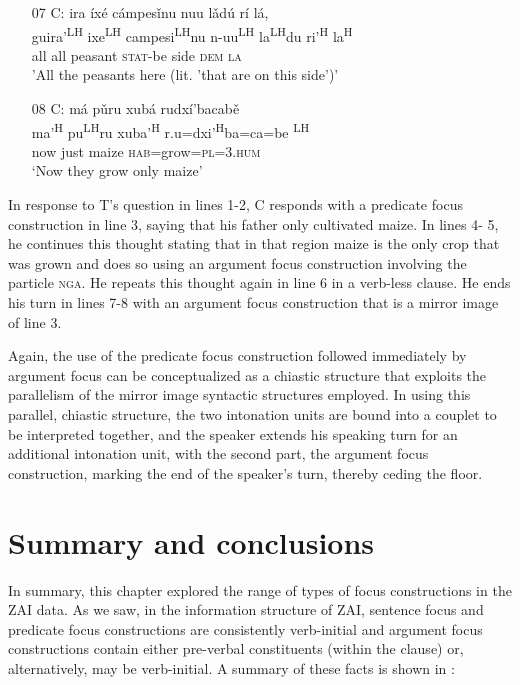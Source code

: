 \begin{itemize}
\item[07 C:] 
\glll ira \'{i}x\'{e} c\'{a}mpes\v{i}nu nuu l\v{a}d\'{u} r\'{i} l\'{a}, \\
guira'\textsuperscript{LH} ixe\textsuperscript{LH} campesi\textsuperscript{LH}nu n-uu\textsuperscript{LH} la\textsuperscript{LH}du ri'\textsuperscript{H}  la\textsuperscript{H} \\
all all peasant \textsc{stat}-be side \textsc{dem} \textsc{la} \\
\glt 'All the peasants here (lit. 'that are on this side')'


\item[08 C:]
\glll m\'{a} p\v{u}ru xub\'{a} rudx\'{i}'bacab\v{e}  \\        
ma'\textsuperscript{H} pu\textsuperscript{LH}ru xuba'\textsuperscript{H} r.u=dxi'\textsuperscript{H}ba=ca=be \textsuperscript{LH}  \\
now just maize \textsc{hab}=grow=\textsc{pl=3.hum}  \\
\glt `Now they grow only maize' 

\end{itemize}
\z

In response to T's question in lines 1-2, C responds with a predicate focus construction in line 3, saying that his father only cultivated maize. In lines 4- 5, he continues this thought stating that in that region maize is the only crop that was grown and does so using an argument focus construction involving the particle \textsc{nga}. He repeats this thought again in line 6 in a verb-less clause. He ends his turn in lines 7-8 with an argument focus construction that is a mirror image of line 3. 

Again, the use of the predicate focus construction followed immediately by argument focus can be conceptualized as a chiastic structure that exploits the parallelism of the mirror image syntactic structures employed. In using this parallel, chiastic structure, the two intonation units are bound into a couplet to be interpreted together, and the speaker extends his speaking turn for an additional intonation unit, with the second part, the argument focus construction, marking the end of the speaker's turn, thereby ceding the floor.


\section{Summary and conclusions}


In summary, this chapter explored the range of types of focus constructions in the ZAI data. As we saw, in the information structure of ZAI, sentence focus and predicate focus constructions are consistently verb-initial and argument focus constructions contain either pre-verbal constituents (within the clause) or, alternatively, may be verb-initial. A summary of these facts is shown in :


